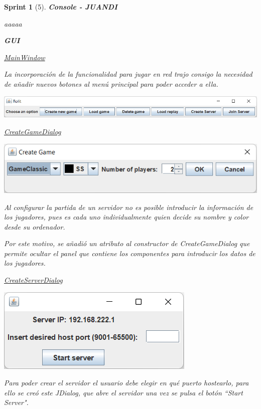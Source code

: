 \documentclass{article}
\theoremstyle{break}
\newtheorem*{sprint}{Sprint}
\begin{document}
\begin{sprint}[5]
\textbf{Console - JUANDI}

aaaaa

\textbf{GUI}

\underline{MainWindow}

La incorporación de la funcionalidad para jugar en red trajo consigo  la necesidad de añadir nuevos botones al menú principal para poder acceder a ella.

\begin{center}
\includegraphics[scale=0.6]{menu-sprint5.png}
\end{center}

\underline{CreateGameDialog}

\begin{center}
\includegraphics[scale=0.8]{create-game-sprint5.png}
\end{center}

Al configurar la partida de un servidor no es posible introducir la información de los jugadores, pues es cada uno individualmente quien decide su nombre y color desde su ordenador.

Por este motivo, se añadió un atributo al constructor de \textit{CreateGameDialog} que permite ocultar el panel que contiene los componentes para introducir los datos de los jugadores.

\underline{CreateServerDialog}
\begin{center}
\includegraphics[scale=0.8]{create-server-sprint5.png}
\end{center}

Para poder crear el servidor el usuario debe elegir en qué puerto hostearlo, para ello se creó este \textit{JDialog}, que abre el servidor una vez se pulsa el botón ``Start Server".


\end{sprint}
\end{document}
